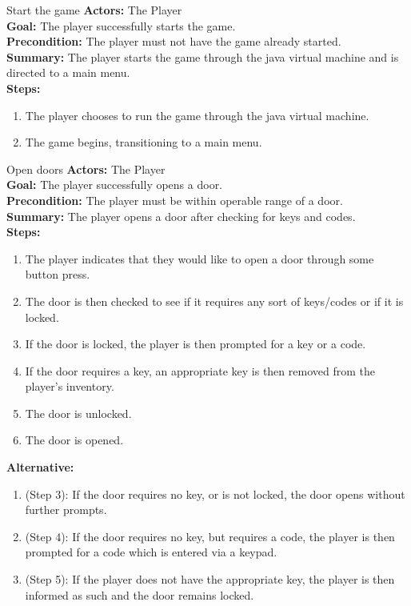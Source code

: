 \documentclass[12pt]{report}
\begin{document}
\begin{subsection}{Start the game}
\textbf{Actors:} The Player \\
\textbf{Goal:} The player successfully starts the game. \\
\textbf{Precondition:} The player must not have the game already started. \\
\textbf{Summary:} The player starts the game through the java virtual machine and is directed to a main menu. \\
\textbf{Steps:}
\begin{enumerate}
	\item The player chooses to run the game through the java virtual machine.
	\item The game begins, transitioning to a main menu.
\end{enumerate}
\end{subsection}

\begin{subsection}{Open doors}
\textbf{Actors:} The Player \\
\textbf{Goal:} The player successfully opens a door. \\
\textbf{Precondition:} The player must be within operable range of a door. \\
\textbf{Summary:} The player opens a door after checking for keys and codes. \\
\textbf{Steps:}
\begin{enumerate}
	\item The player indicates that they would like to open a door through some button press.
	\item The door is then checked to see if it requires any sort of keys/codes or if it is locked.
	\item If the door is locked, the player is then prompted for a key or a code.
	\item If the door requires a key, an appropriate key is then removed from the player's inventory.
	\item The door is unlocked.
	\item The door is opened.
\end{enumerate}
\textbf{Alternative:}
\begin{enumerate}
	\item (Step 3): If the door requires no key, or is not locked, the door opens without further prompts.
	\item (Step 4): If the door requires no key, but requires a code, the player is then prompted for a code which is entered via a keypad.
	\item (Step 5): If the player does not have the appropriate key, the player is then informed as such and the door remains locked.
\end{enumerate}
\end{subsection}
\end{document}
